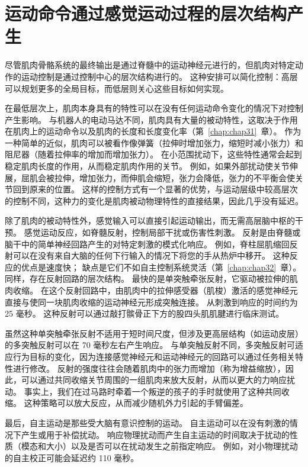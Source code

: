 \section{运动命令通过感觉运动过程的层次结构产生}

尽管肌肉骨骼系统的最终输出是通过脊髓中的运动神经元进行的，但肌肉对特定动作的运动控制是通过控制中心的层次结构进行的。
这种安排可以简化控制：高层可以规划更多的全局目标，而低层则关心这些目标如何实现。


在最低层次上，肌肉本身具有的特性可以在没有任何运动命令变化的情况下对控制产生影响。
与机器人的电动马达不同，肌肉具有大量的被动特性，这取决于作用在肌肉上的运动命令以及肌肉的长度和长度变化率（第~\ref{chap:chap31}~章）。
作为一种简单的近似，肌肉可以被看作像弹簧（拉伸时增加张力，缩短时减小张力）和阻尼器（随着拉伸率的增加而增加张力）。
在小范围扰动下，这些特性通常会起到稳定肌肉长度的作用，从而稳定肌肉作用的关节。
例如，如果外部扰动使关节伸展，屈肌会被拉伸，增加张力，而伸肌会缩短，张力会降低，张力的不平衡会使关节回到原来的位置。
这样的控制方式有一个显著的优势，与运动层级中较高层次的控制不同，这种力的变化是肌肉被动物理特性的直接结果，因此几乎没有延迟。


除了肌肉的被动特性外，感觉输入可以直接引起运动输出，而无需高层脑中枢的干预。
感觉运动反应，如脊髓反射，控制局部干扰或伤害性刺激。
反射是由脊髓或脑干中的简单神经回路产生的对特定刺激的模式化响应。
例如，脊柱屈肌缩回反射可以在没有来自大脑的任何下行输入的情况下将您的手从热炉中移开。
这种反应的优点是速度快；
缺点是它们不如自主控制系统灵活（第~\ref{chap:chap32}~章）。
同样，存在反射回路的层次结构。
最快的是单突触牵张反射，它驱动被拉伸的肌肉收缩。 
在这个反射回路中，由肌肉中的拉伸感受器（肌梭）激活的感觉神经元直接与使同一块肌肉收缩的运动神经元形成突触连接。
从刺激到响应的时间约为 25 毫秒。
这种反射可以通过敲打髌骨正下方的股四头肌肌腱进行临床测试。


虽然这种单突触牵张反射不适用于短时间尺度，但涉及更高层结构（如运动皮层）的多突触反射可以在 70 毫秒左右产生响应。
与单突触反射不同，多突触反射可适应行为目标的变化，因为连接感觉神经元和运动神经元的回路可以通过任务相关特性进行修改。
反射的强度往往会随着肌肉中的张力而增加（称为增益缩放），因此，可以通过共同收缩关节周围的一组肌肉来放大反射，从而以更大的力响应扰动。
事实上，我们在过马路时牵着一个叛逆的孩子的手时就使用了这种共同收缩。
这种策略可以放大反应，从而减少随机外力引起的手臂偏差。


最后，自主运动是那些受大脑有意识控制的运动。
自主运动可以在没有刺激的情况下产生或用于补偿扰动。
响应物理扰动而产生自主运动的时间取决于扰动的性质（模态和大小）以及是否可以在扰动发生之前指定响应。
例如，对小物理扰动的自主校正可能会延迟约 110 毫秒。


